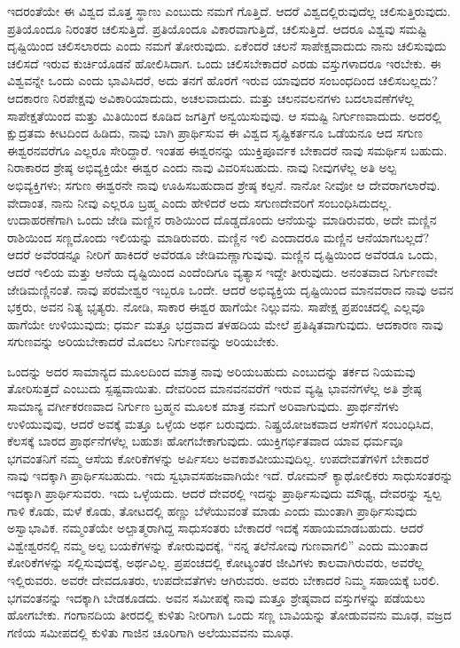ಇದರಂತೆಯೇ ಈ ವಿಶ್ವದ ಮೊತ್ತ ಸ್ಥಾಣು ಎಂಬುದು ನಮಗೆ ಗೊತ್ತಿದೆ. ಆದರೆ ವಿಶ್ವದಲ್ಲಿರುವುದೆಲ್ಲ ಚಲಿಸುತ್ತಿರುವುದು. ಪ್ರತಿಯೊಂದೂ ನಿರಂತರ ಚಲಿಸುತ್ತಿದೆ. ಪ್ರತಿಯೊಂದೂ ವಿಕಾರವಾಗುತ್ತಿದೆ, ಚಲಿಸುತ್ತಿದೆ. ಆದರೂ ವಿಶ್ವವು ಸಮಷ್ಟಿ ದೃಷ್ಟಿಯಿಂದ ಚಲಿಸಲಾರದು ಎಂದು ನಮಗೆ ತೋರುವುದು. ಏಕೆಂದರೆ ಚಲನೆ ಸಾಪೇಕ್ಷವಾದುದು  ನಾನು ಚಲಿಸುವುದು ಚಲಿಸದೆ ಇರುವ ಕುರ್ಚಿಯೊಡನೆ ಹೋಲಿಸಿದಾಗ. ಒಂದು ಚಲಿಸಬೇಕಾದರೆ ಎರಡು ವಸ್ತುಗಳಾದರೂ ಇರಬೇಕು. ಈ ವಿಶ್ವವನ್ನೇ ಒಂದು ಎಂದು ಭಾವಿಸಿದರೆ, ಅದು ತನಗೆ ಹೊರಗೆ ಇರುವ ಯಾವುದರ ಸಂಬಂಧದಿಂದ ಚಲಿಸಬಲ್ಲದು? ಆದಕಾರಣ ನಿರಪೇಕ್ಷವು ಅವಿಕಾರಿಯಾದುದು, ಅಚಲವಾದುದು. ಮತ್ತು ಚಲನವಲನಗಳು ಬದಲಾವಣೆಗಳೆಲ್ಲ ಸಾಪೇಕ್ಷತೆಯಿಂದ ಮತ್ತು ಮಿತಿಯಿಂದ ಕೂಡಿದ ಜಗತ್ತಿಗೆ ಅನ್ವಯಿಸುವುವು. ಆ ಸಮಷ್ಟಿ ನಿರ್ಗುಣವಾದುದು. ಅದರಲ್ಲಿ ಕ್ಷುದ್ರತಮ ಕೀಟದಿಂದ ಹಿಡಿದು, ನಾವು ಬಾಗಿ ಪ್ರಾರ್ಥಿಸುವ ಈ ವಿಶ್ವದ ಸೃಷ್ಟಿಕರ್ತನೂ ಒಡೆಯನೂ ಆದ ಸಗುಣ ಈಶ್ವರನವರೆಗೂ ಎಲ್ಲರೂ ಸೇರಿದ್ದಾರೆ. ಇಂತಹ ಈಶ್ವರನನ್ನು ಯುಕ್ತಿಪೂರ್ವಕ ಬೇಕಾದರೆ ನಾವು ಸಮರ್ಥಿಸ ಬಹುದು. ನಿರಾಕಾರದ ಶ್ರೇಷ್ಠ ಅಭಿವ್ಯಕ್ತಿಯೇ ಈಶ್ವರ ಎಂದು ನಾವು ವಿವರಿಸಬಹುದು. ನಾವು ನೀವುಗಳೆಲ್ಲ ಅತಿ ಅಲ್ಪ ಅಭಿವ್ಯಕ್ತಿಗಳು; ಸಗುಣ ಈಶ್ವರನೇ ನಾವು ಊಹಿಸಬಹುದಾದ ಶ್ರೇಷ್ಠ ಕಲ್ಪನೆ. ನಾನೋ ನೀವೋ ಆ ದೇವರಾಗಲಾರೆವು. ವೇದಾಂತ, ನಾನು ನೀವು ಎಲ್ಲರೂ ಬ್ರಹ್ಮ ಎಂದು ಹೇಳಿದರೆ ಅದು ಸಗುಣದೇವರಿಗೆ ಸಂಬಂಧಿಸಿದುದಲ್ಲ. ಉದಾಹರಣೆಗಾಗಿ ಒಂದು ಜೇಡಿ ಮಣ್ಣಿನ ರಾಶಿಯಿಂದ ದೊಡ್ಡದೊಂದು ಆನೆಯನ್ನು ಮಾಡಿರುವರು, ಅದೇ ಮಣ್ಣಿನ ರಾಶಿಯಿಂದ ಸಣ್ಣದೊಂದು ಇಲಿಯನ್ನು ಮಾಡಿರುವರು. ಮಣ್ಣಿನ ಇಲಿ ಎಂದಾದರೂ ಮಣ್ಣಿನ ಆನೆಯಾಗಬಲ್ಲದೆ? ಆದರೆ ಅವೆರಡನ್ನೂ ನೀರಿಗೆ ಹಾಕಿದರೆ ಅವೆರಡೂ ಜೇಡಿಮಣ್ಣಾಗುವುವು. ಮಣ್ಣಿನ ದೃಷ್ಟಿಯಿಂದ ಅವೆರಡೂ ಒಂದು, ಆದರೆ ಇಲಿಯ ಮತ್ತು ಆನೆಯ ದೃಷ್ಟಿಯಿಂದ ಎಂದೆಂದಿಗೂ ವ್ಯತ್ಯಾಸ ಇದ್ದೇ ತೀರುವುದು. ಅನಂತವಾದ ನಿರ್ಗುಣವೇ ಜೇಡಿಮಣ್ಣಿನಂತೆ. ನಾವು ಪರಮೇಶ್ವರ ಇಬ್ಬರೂ ಒಂದೇ. ಆದರೆ ಅಭಿವ್ಯಕ್ತಿಯ ದೃಷ್ಟಿಯಿಂದ ಮಾನವರಾದ ನಾವು ಅವನ ಭಕ್ತರು, ಅವನ ನಿತ್ಯ ಭೃತ್ಯರು. ನೋಡಿ, ಸಾಕಾರ ಈಶ್ವರ ಹಾಗೆಯೇ ನಿಲ್ಲುವನು. ಸಾಪೇಕ್ಷ ಪ್ರಪಂಚದಲ್ಲಿ ಎಲ್ಲವೂ ಹಾಗೆಯೇ ಉಳಿಯುವುದು; ಧರ್ಮ ಮತ್ತೂ ಭದ್ರವಾದ ತಳಹದಿಯ ಮೇಲೆ ಪ್ರತಿಷ್ಠಿತವಾಗುವುದು. ಆದಕಾರಣ ನಾವು ಸಗುಣವನ್ನು ಅರಿಯಬೇಕಾದರೆ ಮೊದಲು ನಿರ್ಗುಣವನ್ನು ಅರಿಯಬೇಕು.

ಒಂದನ್ನು  ಅದರ ಸಾಮಾನ್ಯದ  ಮೂಲದಿಂದ ಮಾತ್ರ ನಾವು ಅರಿಯಬಹುದು ಎಂಬುದನ್ನು ತರ್ಕದ ನಿಯಮವು ತೋರಿಸುತ್ತದೆ ಎಂಬುದು ಸ್ಪಷ್ಟವಾಯಿತು. ದೇವರಿಂದ ಮಾನವನವರೆಗೆ ಇರುವ ವ್ಯಷ್ಟಿ ಭಾವನೆಗಳೆಲ್ಲ ಅತಿ ಶ್ರೇಷ್ಠ ಸಾಮಾನ್ಯ ವರ್ಗೀಕರಣವಾದ ನಿರ್ಗುಣ ಬ್ರಹ್ಮನ ಮೂಲಕ ಮಾತ್ರ ನಮಗೆ ಅರಿವಾಗುವುದು. ಪ್ರಾರ್ಥನೆಗಳು ಉಳಿಯುವುವು, ಆದರೆ ಅವಕ್ಕೆ ಮತ್ತೂ ಒಳ್ಳೆಯ ಅರ್ಥ ಬರುವುದು. ನಿಷ್ಪ್ರಯೋಜಕವಾದ ಆಸೆಗಳಿಗೆ ಸಂಬಂಧಿಸಿದ, ಕೆಲಸಕ್ಕೆ ಬಾರದ ಪ್ರಾರ್ಥನೆಗಳೆಲ್ಲ ಬಹುಶಃ ಹೋಗಬೇಕಾಗುವುದು. ಯುಕ್ತಿಗರ್ಭಿತವಾದ ಯಾವ ಧರ್ಮವೂ ಭಗವಂತನಿಗೆ ನಮ್ಮ ಆಸೆಯ ಕೋರಿಕೆಗಳನ್ನು ಅರ್ಪಿಸಲು ಅವಕಾಶವೀಯುವುದಿಲ್ಲ. ಉಪದೇವತೆಗಳಿಗೆ ಬೇಕಾದರೆ ನಾವು ಇದಕ್ಕಾಗಿ ಪ್ರಾರ್ಥಿಸಬಹುದು. ಇದು ಸ್ವಭಾವಸಹಜವಾಗಿಯೇ ಇದೆ. ರೋಮನ್ ಕ್ಯಾಥೋಲಿಕರು ಸಾಧುಸಂತರನ್ನು ಇದಕ್ಕಾಗಿ ಪ್ರಾರ್ಥಿಸುವರು. ಇದು ಒಳ್ಳೆಯದು. ಆದರೆ ದೇವರಲ್ಲಿ ಇದನ್ನು ಪ್ರಾರ್ಥಿಸುವುದು ಮೌಢ್ಯ, ದೇವರನ್ನು ಸ್ವಲ್ಪ ಗಾಳಿ ಕೊಡು, ಮಳೆ ಕೊಡು, ತೋಟದಲ್ಲಿ ಹಣ್ಣು ಬೆಳೆಯುವಂತೆ ಮಾಡು ಎಂದು ಮುಂತಾಗಿ ಪ್ರಾರ್ಥಿಸುವುದು ಅಸ್ವಾಭಾವಿಕ. ನಮ್ಮಂತೆಯೇ ಅಲ್ಪಾತ್ಮರಾಗಿದ್ದ ಸಾಧುಸಂತರು ಬೇಕಾದರೆ ಇದಕ್ಕೆ ಸಹಾಯಮಾಡಬಹುದು. ಆದರೆ ವಿಶ್ವೇಶ್ವರನಲ್ಲಿ ನಮ್ಮ ಅಲ್ಪ ಬಯಕೆಗಳನ್ನು ಕೋರುವುದಕ್ಕೆ, “ನನ್ನ ತಲೆನೋವು ಗುಣವಾಗಲಿ'' ಎಂದು ಮುಂತಾದ ಕೋರಿಕೆಗಳನ್ನು ಸಲ್ಲಿಸುವುದಕ್ಕೆ, ಅರ್ಥವಿಲ್ಲ. ಪ್ರಪಂಚದಲ್ಲಿ ಕೋಟ್ಯಂತರ ಜೀವಿಗಳು ಕಾಲವಾಗಿರುವರು, ಅವರೆಲ್ಲ ಇಲ್ಲಿರುವರು. ಅವರೇ ದೇವದೂತರು, ಉಪದೇವತೆಗಳು ಆಗಿರುವರು. ಅವರು ಬೇಕಾದರೆ ನಿಮ್ಮ ಸಹಾಯಕ್ಕೆ ಬರಲಿ. ಭಗವಂತನನ್ನು ಇದಕ್ಕಾಗಿ ಬೇಡಕೂಡದು. ಅವನ ಸಮೀಪಕ್ಕೆ ನಾವು ಮತ್ತೂ ಶ್ರೇಷ್ಠವಾದ ವಸ್ತುಗಳನ್ನು ಪಡೆಯಲು ಹೋಗಬೇಕು. ಗಂಗಾನದಿಯ ತೀರದಲ್ಲಿ ಕುಳಿತು ನೀರಿಗಾಗಿ ಒಂದು ಸಣ್ಣ ಬಾವಿಯನ್ನು ತೋಡುವವನು ಮೂಢ, ವಜ್ರದ ಗಣಿಯ ಸಮೀಪದಲ್ಲಿ ಕುಳಿತು ಗಾಜಿನ ಚೂರಿಗಾಗಿ ಅಲೆಯುವವನು ಮೂಢ.

